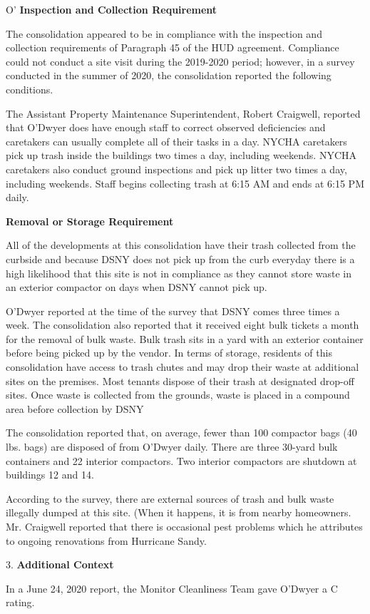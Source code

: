 O'
\textbf{Inspection and Collection Requirement}

The consolidation appeared to be in compliance with the inspection and collection requirements of Paragraph 45 of the HUD agreement. Compliance could not conduct a site visit during the 2019-2020 period; however, in a survey conducted in the summer of 2020, the consolidation reported the following conditions.

The Assistant Property Maintenance Superintendent, Robert Craigwell, reported that O'Dwyer does have enough staff to correct observed deficiencies and caretakers can usually complete all of their tasks in a day. NYCHA caretakers pick up trash inside the buildings two times a day, including weekends. NYCHA caretakers also conduct ground inspections and pick up litter two times a day, including weekends. Staff begins collecting trash at 6:15 AM and ends at 6:15 PM daily. 

\textbf{Removal or Storage Requirement}

All of the developments at this consolidation have their trash collected from the curbside and because DSNY does not pick up from the curb everyday there is a high likelihood that this site is not in compliance as they cannot store waste in an exterior compactor on days when DSNY cannot pick up.

O'Dwyer reported at the time of the survey that DSNY comes three times a week. The consolidation also reported that it received eight bulk tickets a month for the removal of bulk waste. Bulk trash sits in a yard with an exterior container before being picked up by the vendor. In terms of storage, residents of this consolidation have access to trash chutes and may drop their waste at  additional sites on the premises. Most tenants dispose of their trash at designated drop-off sites. Once waste is collected from the grounds, waste is placed in a compound area before collection by DSNY

The consolidation reported that, on average, fewer than 100 compactor bags (40 lbs. bags) are disposed of from O'Dwyer daily. There are three 30-yard bulk containers and 22 interior compactors. Two interior compactors are shutdown at buildings 12 and 14.

According to the survey, there are external sources of trash and bulk waste illegally dumped at this site. (When it happens, it is from nearby homeowners. Mr. Craigwell reported that there is occasional pest problems which he attributes to ongoing renovations from Hurricane Sandy.

3. \textbf{Additional Context} 

In a June 24, 2020 report, the Monitor Cleanliness Team gave O'Dwyer a C rating. 